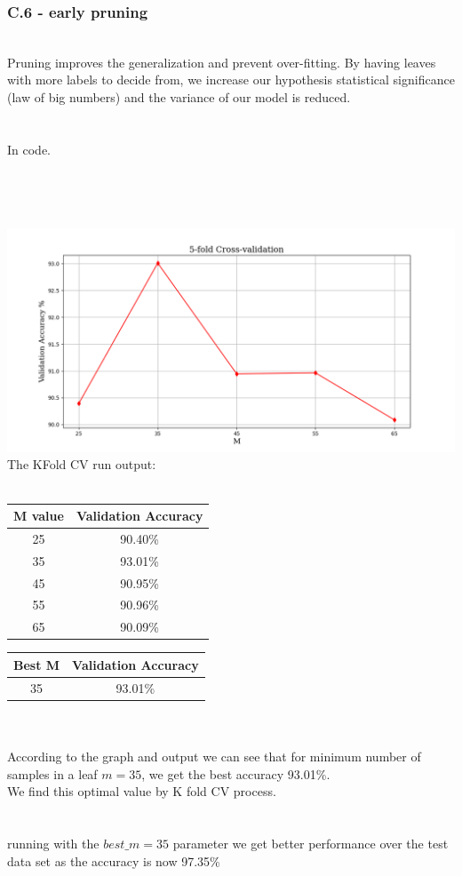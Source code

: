 \documentclass[12pt]{article}
\begin{document}
\subsubsection*{C.6 - early pruning}
\\
Pruning improves the generalization and prevent over-fitting. By having leaves with more labels to decide from, we increase our hypothesis statistical significance (law of big numbers) and the variance of our model is reduced.\\
\\
\\
In code.\\
\\
\\
\\
\\
\includegraphics[scale=0.4]{hw3/plots/cv4.png}
\\
\newpage
The KFold CV run output:\\
\\
\begin{center}
\begin{tabular}{ ||c|c|| } 
 \hline
 M value & Validation Accuracy \\ 
 \hline
 25 & 90.40\% \\ 
 35 & 93.01\% \\ 
 45 & 90.95\% \\ 
 55 & 90.96\% \\ 
 65 & 90.09\% \\ 
 \hline
\end{tabular}
\end{center}
\begin{center}
\begin{tabular}{ ||c|c|| } 
 \hline
Best M  & Validation Accuracy \\ 
 \hline
 35 & 93.01\% \\ 
 \hline
\end{tabular}
\end{center}
\\
\\
According to the graph and output we can see that for minimum number of samples in a leaf $m=35$, we get the best accuracy 93.01\%.\\
We find this optimal value by K fold CV process.\\
\\
\\
running with the  $best\_m=35$ parameter we get better performance over the test data set as the accuracy is now 97.35\%
\end{document}
